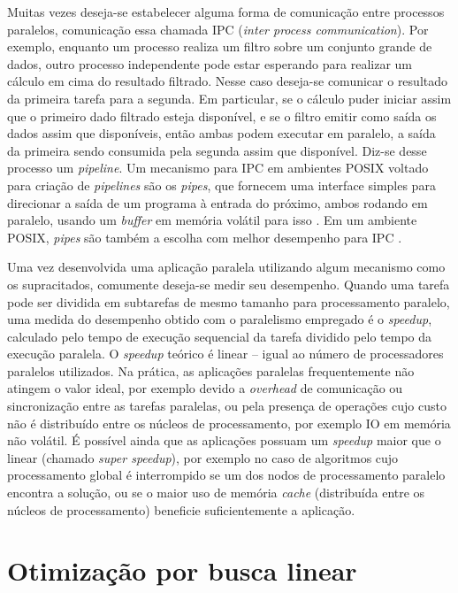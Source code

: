 \documentclass[cic,tc]{iiufrgs}
\begin{document}
Muitas vezes deseja-se estabelecer alguma forma de comunicação entre processos
paralelos, comunicação essa chamada IPC (\textit{inter process communication}).
Por exemplo, enquanto um processo realiza um filtro sobre um conjunto grande
de dados, outro processo independente pode estar esperando para realizar um
cálculo em cima do resultado filtrado. Nesse caso deseja-se comunicar o
resultado da primeira tarefa para a segunda. Em particular, se o cálculo puder
iniciar assim que o primeiro dado filtrado esteja disponível, e se o filtro
emitir como saída os dados assim que disponíveis, então ambas podem executar em
paralelo, a saída da primeira sendo consumida pela segunda assim que
disponível. Diz-se desse processo um \textit{pipeline}. Um mecanismo para IPC
em ambientes POSIX voltado para criação de \textit{pipelines} são os \textit{pipes}, que
fornecem uma interface simples para direcionar a saída de um programa à entrada
do próximo, ambos rodando em paralelo, usando um \textit{buffer} em memória
volátil para isso \cite{immich2003performance}. Em um ambiente POSIX, \textit{pipes} são
também a escolha com melhor desempenho para IPC \cite{immich2003performance}.

Uma vez desenvolvida uma aplicação paralela utilizando algum mecanismo como os
supracitados, comumente deseja-se medir seu desempenho. Quando uma tarefa pode
ser dividida em subtarefas de mesmo tamanho para processamento paralelo, uma
medida do desempenho obtido com o paralelismo empregado é o \textit{speedup},
calculado pelo tempo de execução sequencial da tarefa dividido pelo tempo da
execução paralela. O \textit{speedup} teórico é linear -- igual ao número de
processadores paralelos utilizados. Na prática, as aplicações paralelas
frequentemente não atingem o valor ideal, por exemplo devido a
\textit{overhead} de comunicação ou sincronização entre as tarefas paralelas,
ou pela presença de operações cujo custo não é distribuído entre os núcleos de
processamento, por exemplo IO em memória não volátil. É possível ainda que as
aplicações possuam um \textit{speedup} maior que o linear (chamado
\textit{super speedup}), por exemplo no caso de algoritmos cujo processamento
global é interrompido se um dos nodos de processamento paralelo encontra a
solução, ou se o maior uso de memória \textit{cache} (distribuída entre os
núcleos de processamento) beneficie suficientemente a aplicação.

\section{Otimização por busca linear}
\label{sec:bfgs}
\end{document}
